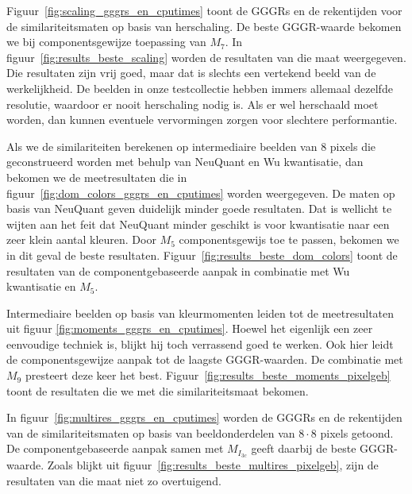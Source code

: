 Figuur~\ref{fig:scaling_gggrs_en_cputimes} toont de GGGRs en de rekentijden voor de 
similariteitsmaten op basis van herschaling. De beste GGGR-waarde bekomen we 
bij componentsgewijze toepassing van $M_7$. In figuur~\ref{fig:results_beste_scaling} worden de resultaten van die maat
weergegeven. Die resultaten zijn vrij goed, maar dat is slechts een vertekend beeld van de
werkelijkheid. De beelden in onze testcollectie hebben immers allemaal dezelfde resolutie,
waardoor er nooit herschaling nodig is. Als er wel herschaald moet worden, dan kunnen
eventuele vervormingen zorgen voor slechtere performantie. 

Als we de similariteiten berekenen op intermediaire beelden van 8 pixels die 
geconstrueerd worden met behulp van NeuQuant en Wu kwantisatie, dan bekomen we
de meetresultaten die in figuur~\ref{fig:dom_colors_gggrs_en_cputimes} worden weergegeven.
De maten op basis van NeuQuant geven duidelijk minder goede resultaten. Dat is wellicht te wijten
aan het feit dat NeuQuant minder geschikt is voor kwantisatie naar een zeer klein aantal 
kleuren. Door $M_5$ componentsgewijs toe te passen, bekomen we in dit geval de beste resultaten. 
Figuur~\ref{fig:results_beste_dom_colors} toont de resultaten van de componentgebaseerde aanpak
in combinatie met Wu kwantisatie en $M_5$.

Intermediaire beelden op basis van kleurmomenten leiden tot de meetresultaten uit 
figuur \ref{fig:moments_gggrs_en_cputimes}. Hoewel het eigenlijk een zeer eenvoudige
techniek is, blijkt hij toch verrassend goed te werken. Ook hier leidt de
componentsgewijze aanpak tot de laagste GGGR-waarden. De combinatie met $M_9$ presteert
deze keer het best. Figuur~\ref{fig:results_beste_moments_pixelgeb} toont de resultaten
die we met die similariteitsmaat bekomen.

In figuur~\ref{fig:multires_gggrs_en_cputimes} worden de GGGRs en de rekentijden van
de similariteitsmaten op basis van beeldonderdelen van $8 \cdot 8$ pixels getoond.
De componentgebaseerde aanpak samen met
$M_{I_{3c}}$ geeft daarbij de beste GGGR-waarde. Zoals blijkt uit
figuur~\ref{fig:results_beste_multires_pixelgeb}, zijn de resultaten van die
maat niet zo overtuigend.

